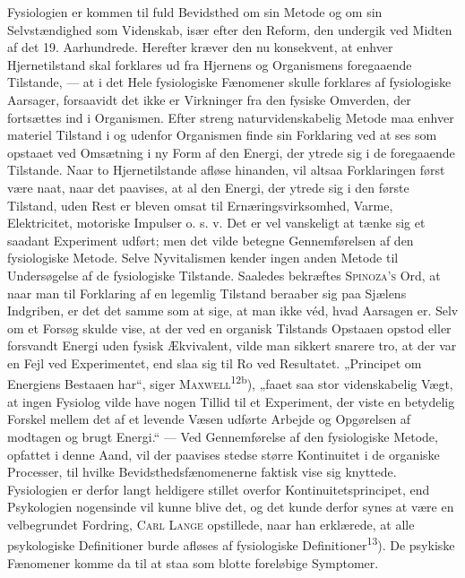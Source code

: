 \documentclass[12pt,a4paper,openany]{book}
\newcommand{\opage}[1]{\marginnote{\footnotesize\textit{[#1]}}}
\begin{document}
Fysiologien er kommen til fuld Bevidsthed om sin Metode og om sin
Selvstændighed som Videnskab, især efter den Reform, den undergik ved Midten af
det 19. Aarhundrede. Herefter kræver den nu konsekvent, at enhver
Hjernetilstand skal forklares ud fra Hjernens og Organismens foregaaende
Tilstande, --- at i det Hele fysiologiske Fænomener skulle forklares af
fysiologiske Aarsager, forsaavidt det ikke er Virkninger fra den fysiske
Omverden, der fortsættes ind i Organismen. Efter streng naturvidenskabelig
Metode maa enhver materiel Tilstand i og udenfor Organismen finde sin
Forklaring ved at ses som opstaaet ved Omsætning i ny Form af den Energi, der
ytrede sig
\opage{14}i de foregaaende Tilstande. Naar to Hjernetilstande afløse hinanden,
vil altsaa Forklaringen først være naat, naar det paavises, at al den Energi,
der ytrede sig i den første Tilstand, uden Rest er bleven omsat til
Ernæringsvirksomhed, Varme, Elektricitet, motoriske Impulser o. s. v. Det er
vel vanskeligt at tænke sig et saadant Experiment udført; men det vilde betegne
Gennemførelsen af den fysiologiske Metode. Selve Nyvitalismen kender ingen
anden Metode til Undersøgelse af de fysiologiske Tilstande. Saaledes bekræftes
\textsc{Spinoza's} Ord, at naar man til Forklaring af en legemlig Tilstand
beraaber sig paa Sjælens Indgriben, er det det samme som at sige, at man ikke
véd, hvad Aarsagen er. Selv om et Forsøg skulde vise, at der ved en organisk
Tilstands Opstaaen opstod eller forsvandt Energi uden fysisk Ækvivalent, vilde
man sikkert snarere tro, at der var en Fejl ved Experimentet, end slaa sig til
Ro ved Resultatet. „Principet om Energiens Bestaaen har“, siger
\textsc{Maxwell}\textsuperscript{12b}), „faaet saa stor videnskabelig Vægt, at
ingen Fysiolog vilde have nogen Tillid til et Experiment, der viste en
betydelig Forskel mellem det af et levende Væsen udførte Arbejde og Opgørelsen
af modtagen og brugt Energi.“ --- Ved Gennemførelse af den fysiologiske Metode,
opfattet i denne Aand, vil der paavises stedse større Kontinuitet i de
organiske Processer, til hvilke Bevidsthedsfænomenerne faktisk vise sig
knyttede. Fysiologien er derfor langt heldigere stillet overfor
Kontinuitetsprincipet, end Psykologien nogensinde vil kunne blive det, og det
kunde derfor synes at være en velbegrundet Fordring, \textsc{Carl Lange}
opstillede, naar han erklærede, at alle psykologiske Definitioner burde afløses
af fysiologiske Definitioner\textsuperscript{13}). De psykiske Fænomener komme
da til at staa som blotte foreløbige Symptomer.
\end{document}
